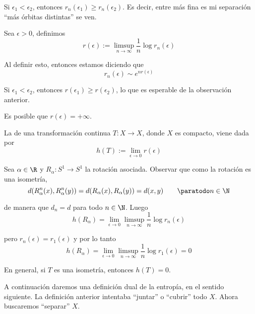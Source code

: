 \documentclass[	docname= Sistemas\ Din\'amicos,
				finished=1,
				semester=1,
				year=2017,
				professor=Godofredo\ Iommi,
				sigla=MAT2565]{apunte}
\begin{document}
\begin{obsd} Si $\epsilon_{1} < \epsilon_{2}$, entonces $r_{n}(\epsilon_{1}) \geq r_{n}(\epsilon_{2})$. Es decir, entre más fina es mi separación ``más órbitas distintas'' se ven.
\end{obsd}

\begin{defn} Sea $\epsilon > 0$, definimos
	$$r(\epsilon) := \limsup_{n \to \infty} \frac{1}{n} \log r_{n}(\epsilon)$$
\end{defn}

\begin{obsd} Al definir esto, entonces estamos diciendo que
	$$r_{n}(\epsilon) \sim e^{n r(\epsilon)}$$

\end{obsd}

\begin{obsd} Si $\epsilon_{1} < \epsilon_{2}$, entonces $r(\epsilon_{1}) \geq r(\epsilon_{2})$, lo que es esperable de la observación anterior.
\end{obsd}

\begin{obsd} Es posible que $r(\epsilon) = +\infty$.
\end{obsd}

\begin{defn} La  de una transformación continua $T: X \to X$, donde $X$ es compacto, viene dada por
	$$h(T) := \lim_{\epsilon \to 0} r(\epsilon)$$
\end{defn}

\begin{ex}[Rotaciones] Sea $\alpha \in \R$ y $R_{\alpha}: S^{1} \to S^{1}$ la rotación asociada. Observar que como la rotación es una isometría,
	$$d(R^{n}_{\alpha}(x), R^{n}_{\alpha}(y)) = d(R_{\alpha}(x), R_{\alpha}(y)) = d(x,y) \qquad \paratodo n \in \N$$

de manera que $d_{n} = d$ para todo $n \in \N$. Luego
	$$h(R_{\alpha}) = \lim_{\epsilon \to 0} \limsup_{n \to \infty} \frac{1}{n} \log r_{n}(\epsilon)$$

pero $r_{n}(\epsilon) = r_{1}(\epsilon)$ y por lo tanto
	$$h(R_{\alpha}) = \lim_{\epsilon \to 0} \limsup_{n \to \infty} \frac{1}{n} \log r_{1}(\epsilon) = 0$$
\end{ex}

\begin{obsex} En general, si $T$ es una isometría, entonces $h(T) = 0$.
\end{obsex}

A continuación daremos una definición dual de la entropía, en el sentido siguiente. La definición anterior intentaba ``juntar'' o ``cubrir'' todo $X$. Ahora buscaremos ``separar'' $X$.
\end{document}

